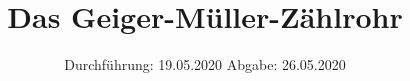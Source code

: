 

\subject{V703}
\title{Das Geiger-Müller-Zählrohr}
\date{%
  Durchführung: 19.05.2020
  \hspace{3em}
  Abgabe: 26.05.2020
}



\maketitle
\thispagestyle{empty}
\tableofcontents
\newpage








\printbibliography{}


